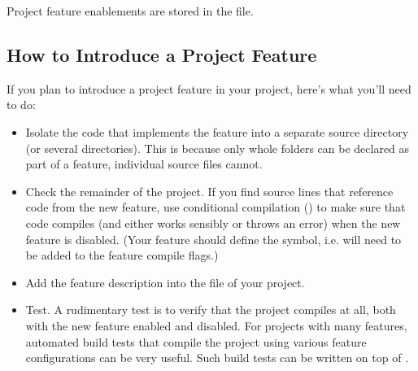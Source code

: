 Project feature enablements are stored in the  file.


\subsection{How to Introduce a Project Feature}
\label{sec:build-sim-progs:introducing-project-features}

If you plan to introduce a project feature in your project, here's what you'll need
to do:

\begin{itemize}
  \item Isolate the code that implements the feature into a separate source directory
        (or several directories). This is because only whole folders can be
        declared as part of a feature, individual source files cannot.

  \item Check the remainder of the project. If you find source lines that reference
        code from the new feature, use conditional compilation ()
        to make sure that code compiles (and either works sensibly or throws an error)
        when the new feature is disabled. (Your feature should define the 
        symbol, i.e.  will need to be added to the feature compile flags.)

  \item Add the feature description into the  file of your project.

  \item Test. A rudimentary test is to verify that the project compiles at all,
        both with the new feature enabled and disabled. For projects with many
        features, automated build tests that compile the project using various
        feature configurations can be very useful. Such build tests can be
        written on top of .
        
\end{itemize}

